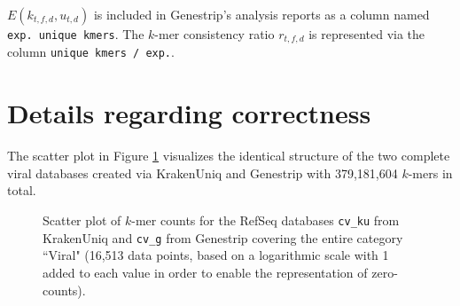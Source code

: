 \documentclass[pdflatex,sn-vancouver-num]{sn-jnl}
\newif\ifscatter
\begin{document}
 $E(k_{t,f,d},u_{t,d})$ is included in Genestrip's analysis reports as a column named \verb|exp. unique kmers|. The $k$-mer consistency ratio $r_{t,f,d}$ is represented via the column \verb|unique kmers / exp.|.
    
\section{Details regarding correctness}
\label{correctnessdet}

The scatter plot in Figure \ref{viraldbscatter} visualizes the identical structure of the two complete viral databases created via KrakenUniq and Genestrip with 379,181,604 $k$-mers in total.

    \begin{figure}[h]%
        \centering
        \ifscatter
        \begin{tikzpicture}
            \begin{axis}[
                title=$k$-mer counts,
                xlabel={\texttt{cv\_ku}},
                ylabel={\texttt{cv\_g}},
                xmode=log,
                ymode=log,
                width = 0.5\textwidth,
                height = 0.5\textwidth,
                legend columns=-1,
                legend style={font=\small},
                legend entries={{Species or below},{Genus},{Above genus}},
                legend to name=legend1
            ]
                \addplot+ [scatter, only marks,mark size=1pt,
                point meta=explicit symbolic,
                scatter/classes={
                        {species or below}={mark=*,blue},
                    genus={mark=square,green},
                    null={mark=triangle,red} %
                }
                ]
                table[col sep=semicolon, header=true, x = {kmers 2}, y = {kmers 1} , meta=rank] {results/viral_gs_ku_dbcomp.csv};
            \end{axis}
        \end{tikzpicture}
        \\

        \ref{legend1}

        \fi
        \caption{Scatter plot of $k$-mer counts for the RefSeq databases \texttt{cv\_ku} from KrakenUniq and \texttt{cv\_g} from Genestrip covering the entire category ``Viral" (16,513 data points, based on a logarithmic scale with 1 added to each value in order to enable the representation of zero-counts).}\label{viraldbscatter}
    \end{figure}
            
\end{document}
